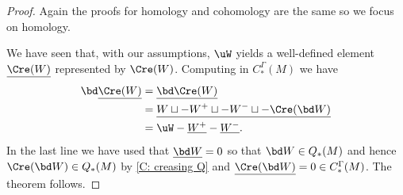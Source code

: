 \begin{proof}
	Again the proofs for homology and cohomology are the same so we focus on homology.

	We have seen that, with our assumptions, $\uW$ yields a well-defined element $\underline{\Cre(W)}$ represented by $\Cre(W)$.
	Computing in $C_*^\Gamma(M)$ we have
	\begin{align*}
		\bd \underline{\Cre(W)}& = \underline{\bd \Cre(W) }\\
		& = \underline{W \sqcup -W^+ \sqcup -W^- \sqcup -\Cre(\bd W)}\\
		& = \uW -\underline{W^+}-\underline{W^-}.
	\end{align*}
	In the last line we have used that $\underline{\bd W} = 0$ so that $\bd W \in Q_*(M)$ and hence $\Cre(\bd W) \in Q_*(M)$ by \cref{C: creasing Q} and $\underline{\Cre(\bd W)} = 0 \in C_*^\Gamma(M)$.
	The theorem follows.
\end{proof}

